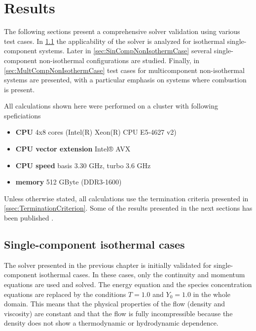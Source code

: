 \chapter{Results}	\label{ch:results}
\glsresetall
The following sections present a comprehensive solver validation using various test cases. In \cref{sec:SingleCompIsotCase} the applicability of the solver is analyzed for isothermal single-component systems. Later in \cref{sec:SinCompNonIsothermCase} several single-component non-isothermal configurations are studied. Finally, in \cref{sec:MultCompNonIsothermCase} test cases for multicomponent non-isothermal systems are presented, with a particular emphasis on systems where combustion is present.

All calculations shown here were performed on a cluster with following speficiations
\begin{itemize}
    \item \textbf{CPU} 4x8 cores (Intel(R) Xeon(R) CPU E5-4627 v2)
    \item \textbf{CPU vector extension} Intel® AVX
    \item \textbf{CPU speed} basis 3.30 GHz, turbo 3.6 GHz
    \item \textbf{memory} 512 GByte (DDR3-1600)
\end{itemize}
Unless otherwise stated, all calculations use the termination criteria presented in \cref{ssec:TerminationCriterion}.
Some of the results presented in the next sections has been published \citep{gutierrez-jorqueraFullyCoupledHighorder2022}.
\section{Single-component isothermal cases}\label{sec:SingleCompIsotCase}
The solver presented in the previous chapter is initially validated for single-component isothermal cases. In these cases, only the continuity and momentum equations are used and solved. The energy equation and the species concentration equations are replaced by the conditions $T = 1.0$ and $Y_0 = 1.0$ in the whole domain. This means that the physical properties of the flow (density and viscosity) are constant and that the flow is fully incompressible because the density does not show a thermodynamic or hydrodynamic dependence.


